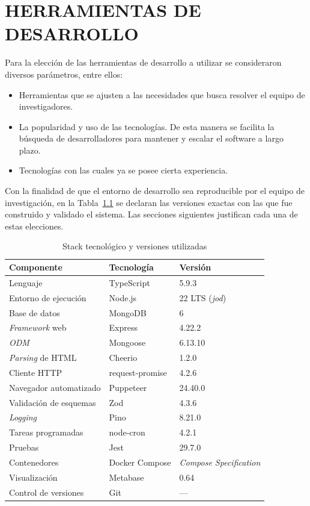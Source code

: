 \documentclass[12pt,letterpaper,oneside]{report}
\begin{document}
\chapter{HERRAMIENTAS DE DESARROLLO}
\label{ch:herramientas}

Para la elecci\'on de las herramientas de desarrollo a utilizar se consideraron diversos par\'ametros, entre ellos:

\begin{itemize}
  \item Herramientas que se ajusten a las necesidades que busca resolver el equipo de investigadores.
  \item La popularidad y uso de las tecnolog\'ias. De esta manera se facilita la b\'usqueda de desarrolladores para mantener y escalar el software a largo plazo.
  \item Tecnolog\'ias con las cuales ya se posee cierta experiencia.
\end{itemize}

Con la finalidad de que el entorno de desarrollo sea reproducible por el equipo de investigaci\'on, en la Tabla~\ref{tab:stack} se declaran las versiones exactas con las que fue construido y validado el sistema. Las secciones siguientes justifican cada una de estas elecciones.

\begin{table}[H]
\centering
\caption{Stack tecnol\'ogico y versiones utilizadas}
\label{tab:stack}
\begin{tabular}{|p{4cm}|p{4.5cm}|p{3cm}|}
\hline
\textbf{Componente} & \textbf{Tecnolog\'ia} & \textbf{Versi\'on} \\
\hline
Lenguaje & TypeScript & 5.9.3 \\
\hline
Entorno de ejecuci\'on & Node.js & 22 LTS (\textit{jod}) \\
\hline
Base de datos & MongoDB & 6 \\
\hline
\textit{Framework} web & Express & 4.22.2 \\
\hline
{\itshape ODM} & Mongoose & 6.13.10 \\
\hline
\textit{Parsing} de HTML & Cheerio & 1.2.0 \\
\hline
Cliente HTTP & request-promise & 4.2.6 \\
\hline
Navegador automatizado & Puppeteer & 24.40.0 \\
\hline
Validaci\'on de esquemas & Zod & 4.3.6 \\
\hline
\textit{Logging} & Pino & 8.21.0 \\
\hline
Tareas programadas & node-cron & 4.2.1 \\
\hline
Pruebas & Jest & 29.7.0 \\
\hline
Contenedores & Docker Compose & \textit{Compose Specification} \\
\hline
Visualizaci\'on & Metabase & 0.64 \\
\hline
Control de versiones & Git & --- \\
\hline
\end{tabular}
\end{table}
\end{document}
